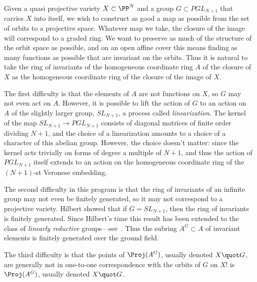 Given a quasi projective variety $X \subset \PP^N$ and a group $G \subset PGL_{N+1}$ that carries $X$ into itself, we wish to construct as good a map as possible from the set of orbits
to a projective space. Whatever map we take, the closure of the
image will correspond to a graded ring. We want to preserve as much of the structure of the orbit space as possible, and on an open affine cover
this means finding as many functions as possible that are invariant on the orbits. Thus it is natural to take the ring of invariants
of the homogeneous coordinate ring $A$ of the closure of $X$ as the homogeneous coordinate ring of the closure
of the image of $X$. 

The first difficulty is that the elements of $A$ are not functions on $X$, so $G$ may not even act on $A$. However, 
it is possible to lift the action of $G$ to an action on $A$ of the slightly larger group, $SL_{N+1}$, a process called \emph{linearization}. The kernel of the map $SL_{N+1} \to PGL_{N+1}$ consists of diagonal matrices of finite order dividing $N+1$, and the choice of
a linearization amounts to a choice of a character of this abelian group. However, the choice doesn't matter: since the kernel acts trivially on forms of degree a multiple
of $N+1$, and thus the action of $PGL_{N+1}$ itself  extends to an action on the homogeneous coordinate ring of the $(N+1)$-st Veronese embedding. 

The second difficulty in this program is that the ring of invariants of an infinite group may not even be finitely generated,
so it may not correspond to a projective variety. Hilbert showed that if $G= SL_{N+1}$, then the ring of invariants
is finitely generated. Since Hilbert's time this result has been extended to the class of 
\emph{linearly reductive} groups---see~\cite{MR0382294}.
Thus the subring $A^G \subset A$ of invariant elements is finitely generated over the ground field.

The third difficulty is that the points of $\Proj(A^G)$, usually denoted $X\quot G$, are generally not in one-to-one correspondence with the orbits of $G$ on $X$! 
is $\Proj(A^G)$, usually denoted $X\quot G$. 

